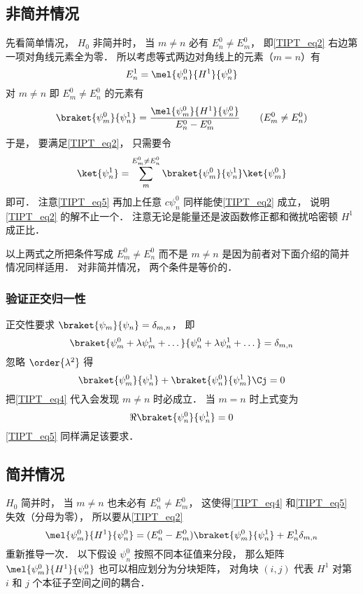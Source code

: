 \subsection{非简并情况}
先看简单情况， $H_0$ 非简并时， 当 $m\ne n$ 必有 $E_n^0 \ne E_m^0$， 即\autoref{TIPT_eq2} 右边第一项对角线元素全为零． 所以考虑等式两边对角线上的元素（$m = n$）有
\begin{equation}\label{TIPT_eq6}
E_n^1 = \mel{\psi_n^0}{H^1}{\psi_n^0}
\end{equation}
对 $m \ne n$ 即 $E_m^0 \ne E_n^0$ 的元素有
\begin{equation}\label{TIPT_eq4}
\braket{\psi_m^0}{\psi_n^1} = \frac{\mel{\psi_m^0}{H^1}{\psi_n^0}}{E_n^0 - E_m^0} \qquad (E_m^0 \ne E_n^0)
\end{equation}
于是， 要满足\autoref{TIPT_eq2}， 只需要令
\begin{equation}\label{TIPT_eq5}
\ket{\psi_n^1} = \sum_m^{E_m^0 \ne E_n^0} \braket{\psi_m^0}{\psi_n^1} \ket{\psi_m^0}
\end{equation}
即可． 注意\autoref{TIPT_eq5} 再加上任意 $c \psi_n^0$ 同样能使\autoref{TIPT_eq2} 成立， 说明\autoref{TIPT_eq2} 的解不止一个． 注意无论是能量还是波函数修正都和微扰哈密顿 $H^1$ 成正比．

以上两式之所把条件写成 $E_m^0 \ne E_n^0$ 而不是 $m \ne n$ 是因为前者对下面介绍的简并情况同样适用． 对非简并情况， 两个条件是等价的．

\subsubsection{验证正交归一性}
正交性要求 $\braket{\psi_m}{\psi_n} = \delta_{m,n}$， 即
\begin{equation}\label{TIPT_eq7}
\braket{\psi_m^0 + \lambda \psi_m^1 + \dots}{\psi_n^0 + \lambda \psi_n^1 + \dots} = \delta_{m,n}
\end{equation}
忽略 $\order{\lambda^2}$ 得
\begin{equation}\label{TIPT_eq8}
\braket{\psi_m^0}{\psi_n^1} + \braket{\psi_n^0}{\psi_m^1}\Cj = 0
\end{equation}
把\autoref{TIPT_eq4} 代入会发现 $m \ne n$ 时必成立． 当 $m = n$ 时上式变为
\begin{equation}
\Re{\braket{\psi_n^0}{\psi_n^1}} = 0
\end{equation}
\autoref{TIPT_eq5} 同样满足该要求．

\subsection{简并情况}
$H_0$ 简并时， 当 $m\ne n$ 也未必有 $E_n^0 \ne E_m^0$， 这使得\autoref{TIPT_eq4} 和\autoref{TIPT_eq5} 失效（分母为零）， 所以要从\autoref{TIPT_eq2}
\begin{equation}
\mel{\psi_m^0}{H^1}{\psi_n^0} = (E_n^0 - E_m^0) \braket{\psi_m^0}{\psi_n^1} + E_n^1 \delta_{m,n}
\end{equation}
重新推导一次． 以下假设 $\psi_n^0$ 按照不同本征值来分段， 那么矩阵 $\mel{\psi_m^0}{H^1}{\psi_n^0}$ 也可以相应划分为分块矩阵， 对角块 $(i,j)$ 代表 $H^1$ 对第 $i$ 和 $j$ 个本征子空间之间的耦合．

